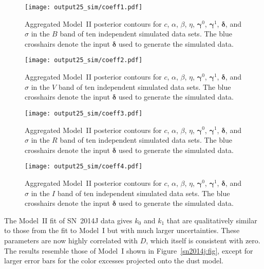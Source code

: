 \documentclass{aastex61}   	%
\begin{document}
\begin{figure}[htbp] %
   \centering
   \texttt{[image: output25\_sim/coeff1.pdf]} 
            \caption{Aggregated Model~II posterior contours for $c$, $\alpha$, $\beta$, $\eta$, $\pmb{\gamma}^0$, $\pmb{\gamma}^1$,  $\pmb{\delta}$, and $\sigma$ in the $B$ band of ten independent simulated data sets.  The blue crosshairs denote the input $\pmb{\delta}$ used to generate the simulated data.
 \label{simglobal2:fig}}
\end{figure}

\begin{figure}[htbp] %
   \centering
   \texttt{[image: output25\_sim/coeff2.pdf]} 
            \caption{Aggregated Model~II posterior contours for $c$, $\alpha$, $\beta$, $\eta$, $\pmb{\gamma}^0$, $\pmb{\gamma}^1$,  $\pmb{\delta}$, and $\sigma$ in the $V$ band of ten independent simulated data sets.   The blue crosshairs denote the input $\pmb{\delta}$ used to generate the simulated data. \label{simglobal3:fig}}
\end{figure}

\begin{figure}[htbp] %
   \centering
      \texttt{[image: output25\_sim/coeff3.pdf]} 
            \caption{Aggregated Model~II posterior contours for $c$, $\alpha$, $\beta$, $\eta$, $\pmb{\gamma}^0$, $\pmb{\gamma}^1$,  $\pmb{\delta}$, and $\sigma$ in the $R$ band of ten independent simulated data sets.   The blue crosshairs denote the input $\pmb{\delta}$ used to generate the simulated data.
\label{simglobal4:fig}}
\end{figure}

\begin{figure}[htbp] %
   \centering
         \texttt{[image: output25\_sim/coeff4.pdf]} 
            \caption{Aggregated Model~II posterior contours for $c$, $\alpha$, $\beta$, $\eta$, $\pmb{\gamma}^0$, $\pmb{\gamma}^1$,  $\pmb{\delta}$, and $\sigma$ in the $I$ band of ten independent simulated data sets.  The blue crosshairs denote the input $\pmb{\delta}$ used to generate the simulated data.
 \label{simglobal5:fig}}
\end{figure}

The Model~II fit of SN~2014J \citet{2014ApJ...788L..21A}  data 
gives $k_0$ and $k_1$ that are qualitatively similar to  those from the fit to Model~I but with much larger uncertainties.
These parameters are now highly correlated with $D$, which itself is consistent with zero.  The results resemble those of
Model~I shown in Figure~\ref{sn2014j:fig}, except for larger error bars for the color excesses projected onto the dust model.
\end{document}
